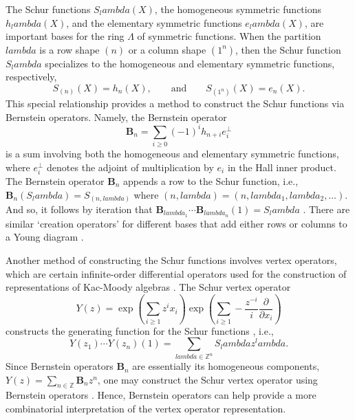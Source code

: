\documentclass[12pt]{amsart}%
\def\lambda{lambda}%
\theoremstyle{remark}
\theoremstyle{definition}
\newcommand{\Z}{\mathbb{Z}}
\begin{document}
    The Schur functions $S_\lambda(X)$, the homogeneous symmetric functions $h_\lambda(X)$, and the elementary symmetric functions $e_\lambda(X)$, are important bases for the ring $\Lambda$ of symmetric functions. When the partition $\lambda$ is a row shape $(n)$ or a column shape $(1^n)$, then the Schur function $S_\lambda$ specializes to the homogeneous and elementary symmetric functions, respectively,
    \[S_{(n)}(X)=h_n(X),\qquad \text{and}\qquad S_{(1^n)}(X)=e_n(X).\]
    This special relationship provides a method to construct the Schur functions via Bernstein operators. Namely, the Bernstein operator
    \begin{equation}\label{eqn: bernstein}
        \mathbf{B}_n=\sum_{i\geq0}(-1)^i h_{n+i}e_i^\perp
    \end{equation}
    is a sum involving both the homogeneous and elementary symmetric functions, where $e_i^\perp$ denotes the adjoint of multiplication by $e_i$ in the Hall inner product. The Bernstein operator $\mathbf{B}_n$ appends a row to the Schur function, i.e., $\mathbf{B}_n(S_\lambda)=S_{(n,\lambda)}$ where $(n,\lambda)=(n,\lambda_1,\lambda_2,\ldots)$. And so, it follows by iteration that $\mathbf{B}_{\lambda_1}\cdots\mathbf{B}_{\lambda_n}(1)=S_\lambda$ \cite[p.~69]{zelevinsky:1981}. There are similar `creation operators' for different bases that add either rows or columns to a Young diagram \cite{zabrocki:2001}.

    Another method of constructing the Schur functions involves vertex operators, which are certain infinite-order differential operators used for the construction of representations of Kac-Moody algebras \cite{kac:1990}. The Schur vertex operator
    \[Y(z)=\exp\left(\sum_{i\geq1}z^ix_i\right)\exp\left(\sum_{i\geq1}-\frac{z^{-i}}{i}\frac{\partial}{\partial x_i}\right)\]
    constructs the generating function for the Schur functions \cite[p.~317]{kac:1990}, i.e., 
    \[Y(z_1)\cdots Y(z_n)(1)=\sum_{\lambda\in\Z^n}S_\lambda z^\lambda.\]
    Since Bernstein operators $\mathbf{B}_n$ are essentially its homogeneous components, $Y(z)=\sum_{n\in\Z}\mathbf{B}_nz^n$, one may construct the Schur vertex operator using Bernstein operators \cite[p.~95]{macdonald:1995}. Hence, Bernstein operators can help provide a more combinatorial interpretation of the vertex operator representation. 
\end{document}
